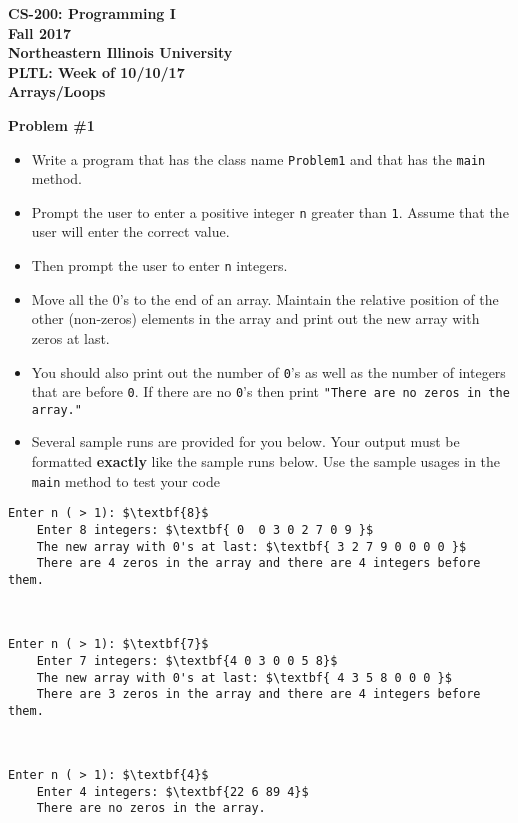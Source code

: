 \documentclass[12pt]{article}
\begin{document}
\begin{center}
	\textbf{CS-200: Programming I}\\
	\textbf{Fall 2017}\\
	\textbf{Northeastern Illinois University}\\
	\textbf{PLTL: Week of 10/10/17}\\
	\textbf{Arrays/Loops}
\end{center}

\noindent\textbf{Problem \#1}
\begin{itemize}
	\item Write a program that has the class name \texttt{Problem1} and that has the \texttt{main} method.
	\item Prompt the user to enter a positive integer \texttt{n} greater than \texttt{1}. Assume that the user will enter the correct value. 
	\item Then prompt the user to enter \texttt{n} integers.
	\item Move all the 0's to the end of an array. Maintain the relative position of the other (non-zeros) elements in the array and print out the new array with zeros at last. 
	\item You should also print out the number of \texttt{0}'s as well as the number of integers that are before \texttt{0}. If there are no \texttt{0}'s then print \texttt{"There are no zeros in the array."}
	\item Several sample runs are provided for you below. Your output must be formatted \textbf{exactly} like the sample runs below. Use the sample usages in the \texttt{main} method to test your code 
\end{itemize}
\begin{center}
\begin{minipage}{12cm}
	\begin{lstlisting}[escapechar=$]
	Enter n ( > 1): $\textbf{8}$
	Enter 8 integers: $\textbf{ 0  0 3 0 2 7 0 9 }$
	The new array with 0's at last: $\textbf{ 3 2 7 9 0 0 0 0 }$
	There are 4 zeros in the array and there are 4 integers before them.
	\end{lstlisting}
\end{minipage}\\
\begin{minipage}{12cm}
	\begin{lstlisting}[escapechar=$]
	Enter n ( > 1): $\textbf{7}$
	Enter 7 integers: $\textbf{4 0 3 0 0 5 8}$
	The new array with 0's at last: $\textbf{ 4 3 5 8 0 0 0 }$
	There are 3 zeros in the array and there are 4 integers before them. 
	\end{lstlisting}
\end{minipage}\\
\begin{minipage}{6cm}
	\begin{lstlisting}[escapechar=$]
	Enter n ( > 1): $\textbf{4}$
	Enter 4 integers: $\textbf{22 6 89 4}$
	There are no zeros in the array.
	\end{lstlisting}
\end{minipage}

\end{center}
\end{document}
